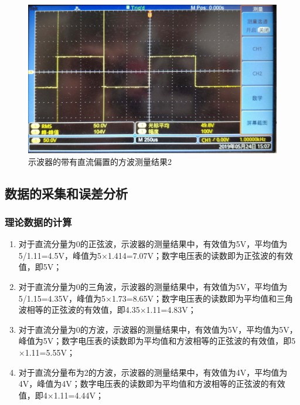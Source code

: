 \documentclass[12pt]{article}
\begin{document}
      \begin{figure}[htbp]
    \centering
    \includegraphics[width=.5\textwidth]{P011}
    \caption{示波器的带有直流偏置的方波测量结果2}\label{dianyaceldyzlbzdfb32}
  \end{figure}
\subsection{数据的采集和误差分析}
\subsubsection{理论数据的计算}
\begin{enumerate}
  \item 对于直流分量为0的正弦波，示波器的测量结果中，有效值为5V，平均值为5/1.11=4.5V，峰值为5$\times$1.414=7.07V；数字电压表的读数即为正弦波的有效值，即5V；
\item 对于直流分量为0的三角波，示波器的测量结果中，有效值为5V，平均值为5/1.15=4.35V，峰值为5$\times$1.73=8.65V；数字电压表的读数即为平均值和三角波相等的正弦波的有效值，即4.35$\times$1.11=4.83V；
\item 对于直流分量为0的方波，示波器的测量结果中，有效值为5V，平均值为5V，峰值为5V；数字电压表的读数即为平均值和方波相等的正弦波的有效值，即5$\times$1.11=5.55V；
\item 对于直流分量布为2的方波，示波器的测量结果中，有效值为4V，平均值为4V，峰值为4V；数字电压表的读数即为平均值和方波相等的正弦波的有效值，即4$\times$1.11=4.44V；
\end{enumerate}
\end{document}
